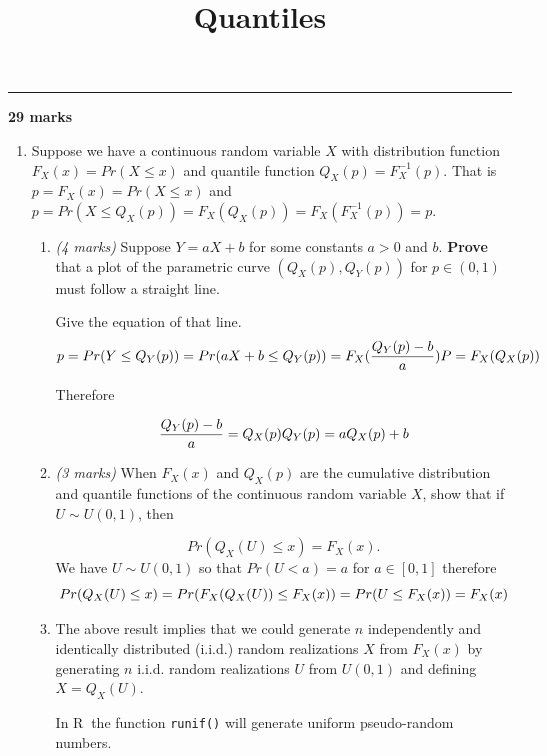 \documentclass[
  9pt,
]{article}
\title{Quantiles}
\author{}
\date{\vspace{-2.5em}}
\begin{document}
\maketitle

\begin{center}\rule{0.5\linewidth}{0.5pt}\end{center}

\textbf{29 marks}

\begin{enumerate}
\def\labelenumi{\arabic{enumi}.}
\item
  Suppose we have a continuous random variable \(X\) with distribution
  function \(F_X(x) = Pr(X \le x)\) and quantile function
  \(Q_X(p) = F_X^{-1}(p)\). That is \(p = F_X(x) = Pr(X \le x)\) and
  \(p = Pr(X \le Q_X(p)) = F_X(Q_X(p)) = F_X(F_X^{-1}(p)) = p\).

  \begin{enumerate}
  \def\labelenumii{\alph{enumii}.}
  \item
    \emph{(4 marks)} Suppose \(Y = aX +b\) for some constants \(a > 0\)
    and \(b\). \textbf{Prove} that a plot of the parametric curve
    \((Q_X(p), Q_Y(p))\) for \(p \in (0,1)\) must follow a straight
    line.

    Give the equation of that line. \[
     p = Pr(Y \le Q_Y(p)) = Pr(aX + b \le Q_Y(p) ) = F_X(\frac{Q_Y(p) - b}{a})\\
     P = F_X(Q_X(p))
     \]

    Therefore

    \[\frac{Q_Y(p)-b}{a} = Q_X(p)\\
     Q_Y(p) = aQ_X(p) + b
     \]
  \item
    \emph{(3 marks)} When \(F_X(x)\) and \(Q_X(p)\) are the cumulative
    distribution and quantile functions of the continuous random
    variable \(X\), show that if \(U \sim U(0,1)\), then

    \[Pr(Q_X(U) \le x )  = F_X(x). \] We have \(U \sim U(0,1)\) so that
    \(Pr(U < a) = a\) for \(a \in [0,1]\) therefore \[
     Pr(Q_X(U) \le x) = Pr(F_X(Q_X(U)) \le F_X(x)) \\
     = Pr(U \le F_X(x)) = F_X(x)
     \]
  \item
    The above result implies that we could generate \(n\) independently
    and identically distributed (i.i.d.) random realizations \(X\) from
    \(F_X(x)\) by generating \(n\) i.i.d. random realizations \(U\) from
    \(U(0,1)\) and defining \(X = Q_X(U)\).

    In \textsf{R}$~$ the function \texttt{runif()} will generate uniform
    pseudo-random numbers.


\end{enumerate}
\end{enumerate}
\end{document}
